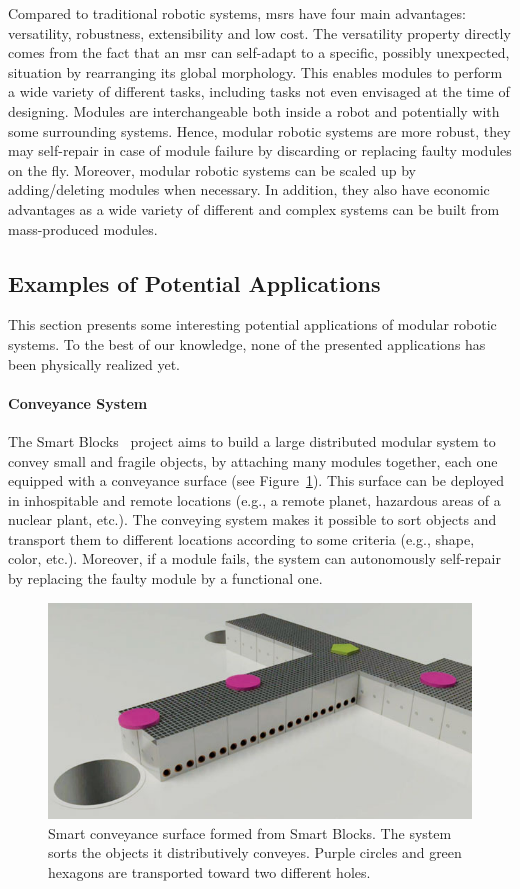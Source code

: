 Compared to traditional robotic systems, \acrshort{msr}s have four main advantages: versatility, robustness, extensibility and low cost. The versatility property directly comes from the fact that an \acrshort{msr} can self-adapt to a specific, possibly unexpected, situation by rearranging its global morphology. This enables modules to perform a wide variety of different tasks, including tasks not even envisaged at the time of designing. Modules are interchangeable both inside a robot and potentially with some surrounding systems. Hence, modular robotic systems are more robust, they may self-repair in case of module failure by discarding or replacing faulty modules on the fly. Moreover, modular robotic systems can be scaled up by adding/deleting modules when necessary. In addition, they also have economic advantages as a wide variety of different and complex systems can be built from mass-produced modules.

\subsection{Examples of Potential Applications}

This section presents some interesting potential applications of modular robotic systems. To the best of our knowledge, none of the presented applications has been physically realized yet.

\paragraph{Conveyance System}
\label{section:context:conveyance-surface}

The Smart Blocks~\cite{piranda2013new} project aims to build a large distributed modular system to convey small and fragile objects, by attaching many modules together, each one equipped with a conveyance surface (see Figure~\ref{fig:context:conveyance-surface}). This surface can be deployed in inhospitable and remote locations (e.g., a remote planet, hazardous areas of a nuclear plant, etc.). The conveying system makes it possible to sort objects and transport them to different locations according to some criteria (e.g., shape, color, etc.). Moreover, if a module fails, the system can autonomously self-repair by replacing the faulty module by a functional one.

\begin{figure}[!h]
	\centering
	\includegraphics[width=0.5\linewidth]{images/context/conveyance-surface.jpg}
	\caption{Smart conveyance surface formed from Smart Blocks. The system sorts the objects it distributively conveyes. Purple circles and green hexagons are transported toward two different holes.}
	\label{fig:context:conveyance-surface}
\end{figure}

